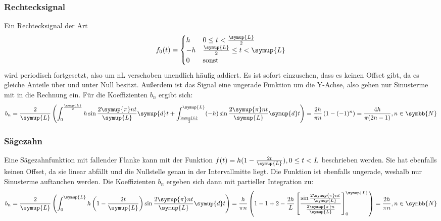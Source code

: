\subsubsection{Rechtecksignal}
Ein Rechtecksignal der Art
\begin{equation}
    f_0(t)=
    \begin{cases}
        h  & 0\leq t < \frac{\symup{L}}{2}  \\
        -h & \frac{\symup{L}}{2} \leq t <\symup{L} \\
        0  & \text{sonst}           \\
    \end{cases}
    \label{eqn:Rechteck}
\end{equation}
wird periodisch fortgesetzt, also um nL verschoben unendlich häufig addiert.
Es ist sofort einzusehen, dass es keinen Offset gibt, da es gleiche Anteile über und
unter Null besitzt. Außerdem ist das Signal eine ungerade Funktion um die Y-Achse,
also gehen nur Sinusterme mit in die Rechnung ein. Für die Koeffizienten $b_n$
ergibt sich:
\begin{equation}
    b_n=\frac{2}{\symup{L}}\left(\int_0^{\frac{\symup{L}}{2}}h\sin{\frac{2\symup{\pi}nt}{\symup{L}}}\symup{d}t+\int_{\frac{\symup{L}}{2}}^{\symup{L}}(-h)\sin{\frac{2\symup{\pi}nt}{\symup{L}}}\symup{d}t\right)
    =\frac{2h}{\pi n}\left(1-(-1)^n\right)
    =\frac{4h}{\pi(2n-1)}  , n\in \symbb{N}
    \label{eqn:Rechteck-Koeff}
\end{equation}
\subsubsection{Sägezahn}
Eine Sägezahnfunktion mit fallender Flanke kann mit der Funktion
$f(t)=h(1-\frac{2t}{\symup{L}}), 0\leq t<L$ beschrieben werden. Sie hat ebenfalls
keinen Offset, da sie linear abfällt und die Nullstelle genau in der Intervallmitte liegt. Die Funktion
ist ebenfalls ungerade, weshalb nur Sinusterme auftauchen werden.
Die Koeffizienten $b_n$ ergeben sich dann mit partieller Integration zu:
\begin{equation}
    b_n=\frac{2}{\symup{L}}\left(\int_0^{\symup{L}}h\left(1-\frac{2t}{\symup{L}}\right)\sin{\frac{2\symup{\pi}nt}{\symup{L}}}\symup{d}t\right)
    =\frac{h}{\pi n}\left(1-1+2-\frac{2h}{L}\left[\frac{\sin{\frac{2\symup{\pi}nt}{\symup{L}}}}{\frac{2\symup{\pi}n}{\symup{L}}}\right]_0^{\symup{L}}\right)
    =\frac{2h}{\pi n}  , n\in \symbb{N}
    \label{eqn:Sägezahn-Koeff}
\end{equation}
